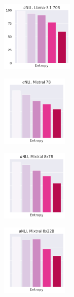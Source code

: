 

\begin{figure}[t]
    \centering
    \begin{subfigure}[b]{0.22\textwidth}
        \includegraphics[height=3.4cm]{figures/appendix/entropy_acc_abductivenli_70B}
    \end{subfigure}
    \begin{subfigure}[b]{0.22\textwidth}
        \includegraphics[height=3.4cm]{figures/appendix/entropy_acc_abductivenli_7B}
    \end{subfigure}
    \begin{subfigure}[b]{0.22\textwidth}
        \includegraphics[height=3.4cm]{figures/appendix/entropy_acc_abductivenli_8x7B}
    \end{subfigure}
    \begin{subfigure}[b]{0.22\textwidth}
        \includegraphics[height=3.4cm]{figures/appendix/entropy_acc_abductivenli_8x22B}
    \end{subfigure}\\

\end{figure}
